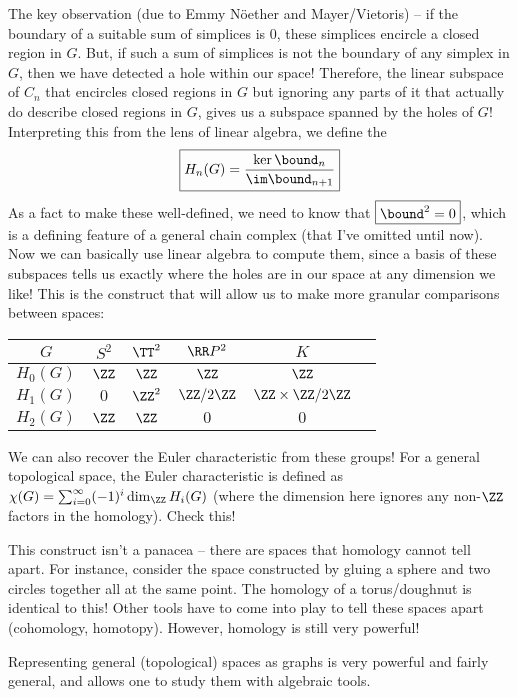\documentclass[12pt]{article}
\begin{document}
  The key observation (due to Emmy N\"oether and Mayer/Vietoris) -- if the boundary of a           suitable sum of simplices is 0,
  these simplices encircle a closed region in $G$. But, if such a sum of
  simplices is not the boundary of any simplex in $G$, then we have
  detected a hole within our space! Therefore, the linear subspace of $C_n$
  that encircles closed regions in $G$ but ignoring any parts of it that actually
  do describe closed regions in $G$, gives us a subspace spanned by the
  holes of $G$! Interpreting this from the lens of linear
  algebra, we define the 
  \[
  \boxed{H_n(G) = \frac{\ker \bound_n}{\im \bound_{n+1}}}
  \]
  As a fact to make these well-defined, we need to know that $\boxed{\bound^2 = 0}$, which
  is a defining feature of a general chain complex (that I've omitted until now).
  Now we can basically use linear algebra to compute them, since a basis of
  these subspaces tells us exactly where the holes are in our space at any
  dimension we like! This is the construct that will allow us to make more
  granular comparisons between spaces:
  \begin{center}
      \begin{tabular}{c|ccccc}
        $G$ & $S^2$ & $\TT^2$ & $\RR P^2$ & $K$ \\ \hline
        $H_0(G)$ & $\ZZ$ & $\ZZ$ & $\ZZ$ & $\ZZ$ \\
        $H_1(G)$ & $0$ & $\ZZ^2$ & $\ZZ / 2 \ZZ $ & $\ZZ \times \ZZ / 2\ZZ$ \\
        $H_2(G)$ & $\ZZ$ & $\ZZ$ & $0$ & $0$ \\
      \end{tabular}                                    
    \end{center}
 
  \begin{exercise}
  We can also recover the Euler characteristic from these groups! For a general
  topological space, the Euler characteristic is defined as $\chi(G) =
  \sum_{i=0}^\infty (-1)^i \dim_{\ZZ} H_i(G)$ (where the dimension here ignores
  any non-$\ZZ$ factors in the homology). Check this!
  \end{exercise}
 
  This construct isn't a panacea -- there are spaces that homology cannot tell
  apart. For instance, consider the space constructed by gluing a sphere and two
  circles together all at the same point. The homology of a torus/doughnut is
  identical to this! Other tools have to come into play to tell these spaces
  apart (cohomology, homotopy). However, homology is still very powerful!
  \begin{idea}
    Representing general (topological) spaces as graphs is very
  powerful and fairly general, and allows one to study them with algebraic tools.
  \end{idea}
\end{document}
